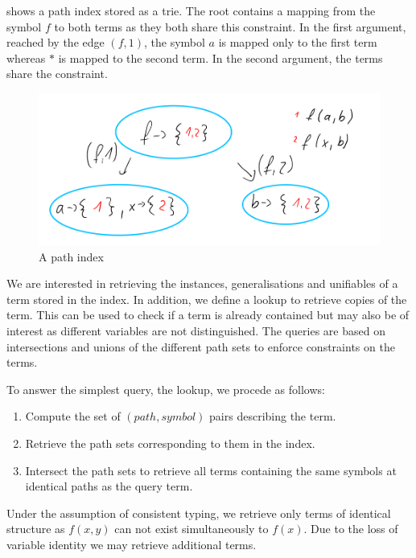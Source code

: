 shows a path index stored as a trie. The root contains a mapping from the symbol $f$ to both terms as they both share this constraint. In the first argument, reached by the edge $(f,1)$, the symbol $a$ is mapped only to the first term whereas $*$ is mapped to the second term. In the second argument, the terms share the constraint.
\begin{figure}[h]
\centering
\includegraphics[scale=0.25]{figures/path_index.png}
\caption{A path index}
\label{pathindex}
\end{figure}

We are interested in retrieving the instances, generalisations and unifiables of a term stored in the index. In addition, we define a lookup to retrieve copies of the term. This can be used to check if a term is already contained but may also be of interest as different variables are not distinguished. The queries are based on intersections and unions of the different path sets to enforce constraints on the terms.

To answer the simplest query, the lookup, we procede as follows:
\begin{enumerate}
  \item Compute the set of $(path, symbol)$ pairs describing the term.
  \item Retrieve the path sets corresponding to them in the index.
  \item Intersect the path sets to retrieve all terms containing the same symbols at identical paths as the query term.
\end{enumerate}
  Under the assumption of consistent typing, we retrieve only terms of identical structure as $f(x,y)$ can not exist simultaneously to $f(x)$. Due to the loss of variable identity we may retrieve additional terms.


